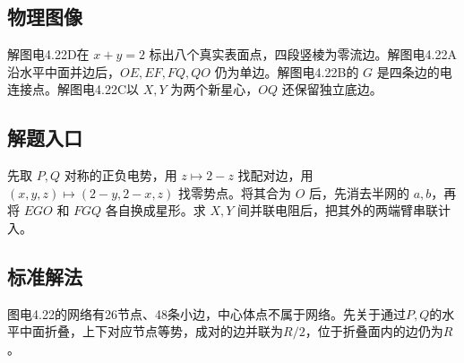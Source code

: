 \documentclass[UTF8,fontset=fandol,a4paper,11pt]{ctexart}
\begin{document}

\subsection*{物理图像}

解图电4.22D在 $x+y=2$ 标出八个真实表面点，四段竖棱为零流边。解图电4.22A沿水平中面并边后，$OE,EF,FQ,QO$ 仍为单边。解图电4.22B的 $G$ 是四条边的电连接点。解图电4.22C以 $X,Y$ 为两个新星心，$OQ$ 还保留独立底边。



\subsection*{解题入口}

先取 $P,Q$ 对称的正负电势，用 $z\mapsto2-z$ 找配对边，用 $(x,y,z)\mapsto(2-y,2-x,z)$ 找零势点。将其合为 $O$ 后，先消去半网的 $a,b$，再将 $EGO$ 和 $FGQ$ 各自换成星形。求 $X,Y$ 间并联电阻后，把其外的两端臂串联计入。


\subsection*{标准解法}

图电4.22的网络有26节点、48条小边，中心体点不属于网络。先关于通过$P,Q$的水平中面折叠，上下对应节点等势，成对的边并联为$R/2$，位于折叠面内的边仍为$R$。
\end{document}
